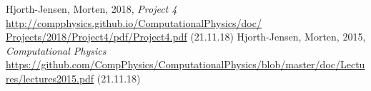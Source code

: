 \documentclass{emulateapj}
\begin{document}
\begin{acknowledgements}

\end{acknowledgements}

\begin{thebibliography}{}
 Hjorth-Jensen, Morten, 2018, \textit{Project 4} \url{http://compphysics.github.io/ComputationalPhysics/doc/
Projects/2018/Project4/pdf/Project4.pdf} (21.11.18)
 Hjorth-Jensen, Morten, 2015, \textit{Computational Physics} \url{https://github.com/CompPhysics/ComputationalPhysics/blob/master/doc/Lectures/lectures2015.pdf} (21.11.18)

\bibitem{}
\end{thebibliography}
\end{document}
